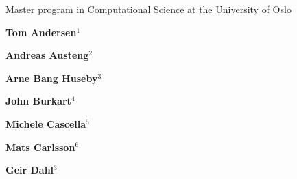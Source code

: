 \documentclass[%
oneside,                 %
final,                   %
10pt]{article}
\begin{document}

\newcommand{\exercisesection}[1]{\subsection*{#1}}






\thispagestyle{empty}

\begin{center}
{\LARGE\bf
\begin{spacing}{1.25}
Master program in Computational Science  at the University of Oslo
\end{spacing}
}
\end{center}


\begin{center}
{\bf Tom Andersen${}^{1}$} \\ [0mm]
\end{center}


\begin{center}
{\bf Andreas Austeng${}^{2}$} \\ [0mm]
\end{center}


\begin{center}
{\bf Arne Bang Huseby${}^{3}$} \\ [0mm]
\end{center}


\begin{center}
{\bf John Burkart${}^{4}$} \\ [0mm]
\end{center}


\begin{center}
{\bf Michele Cascella${}^{5}$} \\ [0mm]
\end{center}


\begin{center}
{\bf Mats Carlsson${}^{6}$} \\ [0mm]
\end{center}


\begin{center}
{\bf Geir Dahl${}^{3}$} \\ [0mm]
\end{center}
\end{document}
